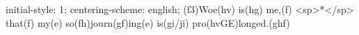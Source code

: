 initial-style: 1;
centering-scheme: english;
(f3)Woe(hv) is(hg) me,(f) <sp>*</sp> that(f) my(e) so(fh)journ(gf)ing(e) is(gi/ji) pro(hvGE)longed.(ghf)
